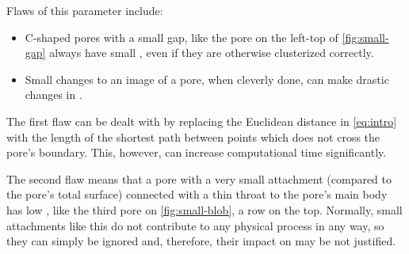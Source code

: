 \documentclass[reprint,amsmath,amssymb,aps,pre,showkeys,showpacs]{revtex4-1}
\newcommand{\highlight}[1]{{\color{red}{#1}}} %
\begin{document}
Flaws of this parameter include:
\begin{itemize}
\item C-shaped pores with a small gap, like the pore on the left-top of
  \cref{fig:small-gap} always have small \highlight{awesomeness}, even if they
  are otherwise clusterized correctly.
\item Small changes to an image of a pore, when cleverly done, can make drastic
  changes in \highlight{awesomeness}.
\end{itemize}

The first flaw can be dealt with by replacing the Euclidean distance in
\cref{eq:intro} with the length of the shortest path between points which does
not cross the pore's boundary. This, however, can increase computational time
significantly.

The second flaw means that a pore with a very small attachment (compared to the
pore's total surface) connected with a thin throat to the pore's main body has
low \highlight{awesomeness}, like the third pore on \cref{fig:small-blob}, a row
on the top. Normally, small attachments like this do not contribute to any
physical process in any way, so they can simply be ignored and, therefore, their
impact on \highlight{awesomeness} may be not justified.


\end{document}

